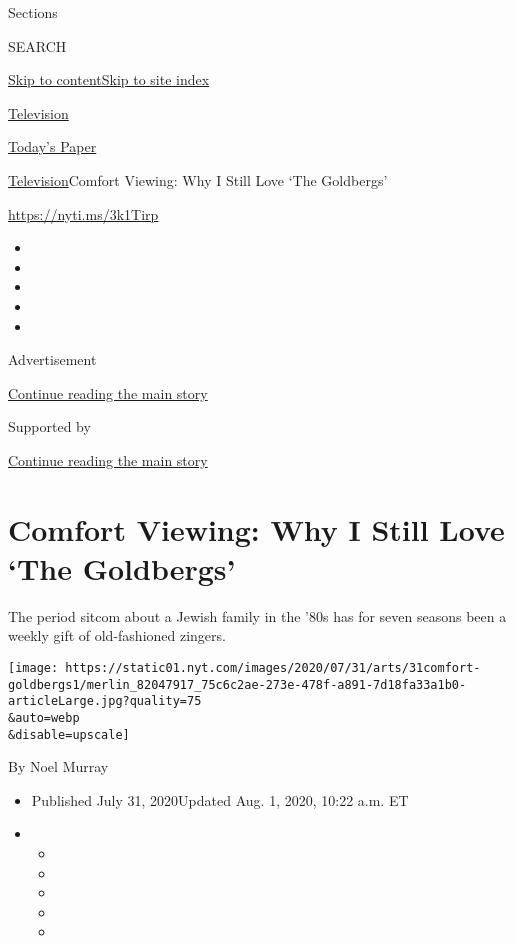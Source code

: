 Sections

SEARCH

\protect\hyperlink{site-content}{Skip to
content}\protect\hyperlink{site-index}{Skip to site index}

\href{https://www.nytimes.com/section/arts/television}{Television}

\href{https://myaccount.nytimes.com/auth/login?response_type=cookie\&client_id=vi}{}

\href{https://www.nytimes.com/section/todayspaper}{Today's Paper}

\href{/section/arts/television}{Television}\textbar{}Comfort Viewing:
Why I Still Love `The Goldbergs'

\url{https://nyti.ms/3k1Tirp}

\begin{itemize}
\item
\item
\item
\item
\item
\end{itemize}

Advertisement

\protect\hyperlink{after-top}{Continue reading the main story}

Supported by

\protect\hyperlink{after-sponsor}{Continue reading the main story}

\hypertarget{comfort-viewing-why-i-still-love-the-goldbergs}{%
\section{Comfort Viewing: Why I Still Love `The
Goldbergs'}\label{comfort-viewing-why-i-still-love-the-goldbergs}}

The period sitcom about a Jewish family in the '80s has for seven
seasons been a weekly gift of old-fashioned zingers.

\texttt{[image: https://static01.nyt.com/images/2020/07/31/arts/31comfort-goldbergs1/merlin\_82047917\_75c6c2ae-273e-478f-a891-7d18fa33a1b0-articleLarge.jpg?quality=75\\\&auto=webp\\\&disable=upscale]}

By Noel Murray

\begin{itemize}
\item
  Published July 31, 2020Updated Aug. 1, 2020, 10:22 a.m. ET
\item
  \begin{itemize}
  \item
  \item
  \item
  \item
  \item
  \end{itemize}
\end{itemize}

